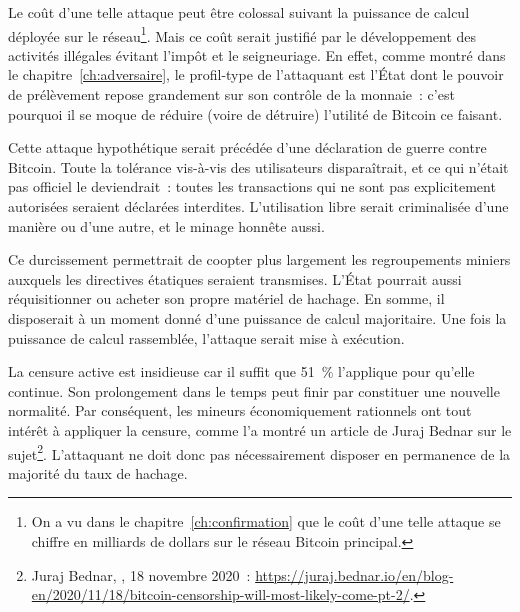 Le coût d'une telle attaque peut être colossal suivant la puissance de calcul déployée sur le réseau\footnote{On a vu dans le chapitre~\ref{ch:confirmation} que le coût d'une telle attaque se chiffre en milliards de dollars sur le réseau Bitcoin principal.}. Mais ce coût serait justifié par le développement des activités illégales évitant l'impôt et le seigneuriage. En effet, comme montré dans le chapitre~\ref{ch:adversaire}, le profil-type de l'attaquant est l'État dont le pouvoir de prélèvement repose grandement sur son contrôle de la monnaie~: c'est pourquoi il se moque de réduire (voire de détruire) l'utilité de Bitcoin ce faisant.

Cette attaque hypothétique serait précédée d'une déclaration de guerre contre Bitcoin. Toute la tolérance vis-à-vis des utilisateurs disparaîtrait, et ce qui n'était pas officiel le deviendrait~: toutes les transactions qui ne sont pas explicitement autorisées seraient déclarées interdites. L'utilisation libre serait criminalisée d'une manière ou d'une autre, et le minage honnête aussi.


Ce durcissement permettrait de coopter plus largement les regroupements miniers auxquels les directives étatiques seraient transmises. L'État pourrait aussi réquisitionner ou acheter son propre matériel de hachage. En somme, il disposerait à un moment donné d'une puissance de calcul majoritaire. Une fois la puissance de calcul rassemblée, l'attaque serait mise à exécution.

La censure active est insidieuse car il suffit que 51~\% l'applique pour qu'elle continue. Son prolongement dans le temps peut finir par constituer une nouvelle normalité. Par conséquent, les mineurs économiquement rationnels ont tout intérêt à appliquer la censure, comme l'a montré un article de Juraj Bednar sur le sujet\footnote{Juraj Bednar, , 18 novembre 2020~: \url{https://juraj.bednar.io/en/blog-en/2020/11/18/bitcoin-censorship-will-most-likely-come-pt-2/}.}. L'attaquant ne doit donc pas nécessairement disposer en permanence de la majorité du taux de hachage.

